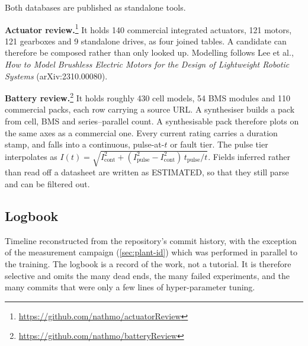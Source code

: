 Both databases are published as standalone tools.

\textbf{Actuator review.}\footnote{\url{https://github.com/nathmo/actuatorReview}} It holds 140
commercial integrated actuators, 121 motors, 121 gearboxes and 9 standalone drives, as four joined
tables. A candidate can therefore be composed rather than only looked up. Modelling follows Lee et
al., \emph{How to Model Brushless Electric Motors for the Design of Lightweight Robotic Systems}
(arXiv:2310.00080).

\textbf{Battery review.}\footnote{\url{https://github.com/nathmo/batteryReview}} It holds roughly
430 cell models, 54 BMS modules and 110 commercial packs, each row carrying a source URL. A
synthesiser builds a pack from cell, BMS and series--parallel count. A synthesisable pack
therefore plots on the same axes as a commercial one. Every current rating carries a duration
stamp, and falls into a continuous, pulse-at-$t$ or fault tier. The pulse tier interpolates as
$I(t) = \sqrt{I_{\text{cont}}^2 + (I_{\text{pulse}}^2 - I_{\text{cont}}^2)\,t_{\text{pulse}}/t}$.
Fields inferred rather than read off a datasheet are written as ESTIMATED, so that they
still parse and can be filtered out.

\newpage

\subsection{Logbook}
\label{sec:app-logbook}
Timeline reconstructed from the repository's commit history, with the exception of the measurement campaign
(\cref{sec:plant-id}) which was performed in parallel to the training. The logbook is a record of
the work, not a tutorial. It is therefore selective and omits the many dead ends, the many failed experiments, and the many commits that were only a few lines of hyper-parameter tuning.

